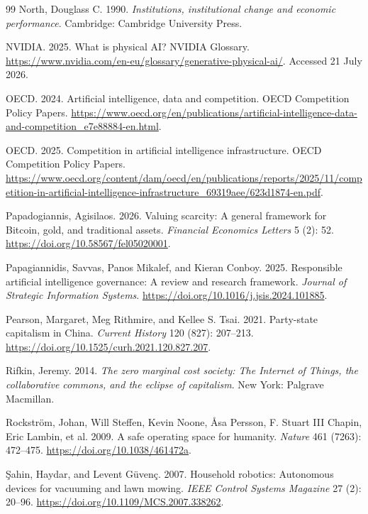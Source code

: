 \documentclass[11pt]{article}
\begin{document}
\begin{thebibliography}{99}
North, Douglass C. 1990. \textit{Institutions, institutional change and economic performance}. Cambridge: Cambridge University Press.

NVIDIA. 2025. What is physical AI? NVIDIA Glossary. \url{https://www.nvidia.com/en-eu/glossary/generative-physical-ai/}. Accessed 21 July 2026.

OECD. 2024. Artificial intelligence, data and competition. OECD Competition Policy Papers. \url{https://www.oecd.org/en/publications/artificial-intelligence-data-and-competition_e7e88884-en.html}.


OECD. 2025. Competition in artificial intelligence infrastructure. OECD Competition Policy Papers. \url{https://www.oecd.org/content/dam/oecd/en/publications/reports/2025/11/competition-in-artificial-intelligence-infrastructure_69319aee/623d1874-en.pdf}.

Papadogiannis, Agisilaos. 2026. Valuing scarcity: A general framework for Bitcoin, gold, and traditional assets. \textit{Financial Economics Letters} 5 (2): 52. \url{https://doi.org/10.58567/fel05020001}.

Papagiannidis, Savvas, Panos Mikalef, and Kieran Conboy. 2025. Responsible artificial intelligence governance: A review and research framework. \textit{Journal of Strategic Information Systems}. \url{https://doi.org/10.1016/j.jsis.2024.101885}.

Pearson, Margaret, Meg Rithmire, and Kellee S. Tsai. 2021. Party-state capitalism in China. \textit{Current History} 120 (827): 207--213. \url{https://doi.org/10.1525/curh.2021.120.827.207}.


Rifkin, Jeremy. 2014. \textit{The zero marginal cost society: The Internet of Things, the collaborative commons, and the eclipse of capitalism}. New York: Palgrave Macmillan.

Rockstr\"{o}m, Johan, Will Steffen, Kevin Noone, \AA sa Persson, F. Stuart III Chapin, Eric Lambin, et al. 2009. A safe operating space for humanity. \textit{Nature} 461 (7263): 472--475. \url{https://doi.org/10.1038/461472a}.

\c{S}ahin, Haydar, and Levent G\"{u}ven\c{c}. 2007. Household robotics: Autonomous devices for vacuuming and lawn mowing. \textit{IEEE Control Systems Magazine} 27 (2): 20--96. \url{https://doi.org/10.1109/MCS.2007.338262}.


\end{thebibliography}
\end{document}
